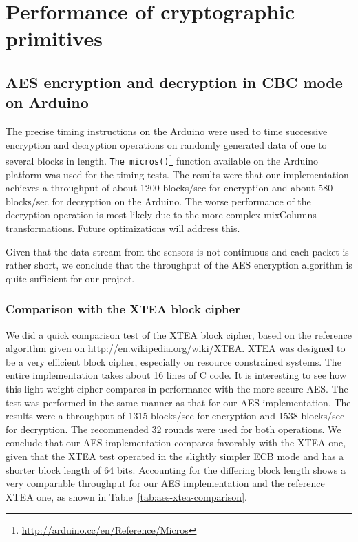 \section{Performance of cryptographic primitives}

\subsection{AES encryption and decryption in CBC mode on Arduino}

The precise timing instructions on the Arduino were used to time successive encryption and decryption operations on randomly generated data of one to several blocks in length. \texttt{The micros()}\footnote{\url{http://arduino.cc/en/Reference/Micros}} function available on the Arduino platform was used for the timing tests. The results were that our implementation achieves a throughput of about 1200 blocks/sec for encryption and about 580 blocks/sec for decryption on the Arduino. The worse performance of the decryption operation is most likely due to the more complex mixColumns transformations. Future optimizations will address this.

Given that the data stream from the sensors is not continuous and each packet is rather short, we conclude that the throughput of the AES encryption algorithm is quite sufficient for our project.

\subsubsection*{Comparison with the XTEA block cipher}

We did a quick comparison test of the XTEA \cite{} block cipher, based on the reference algorithm given on \url{http://en.wikipedia.org/wiki/XTEA}. XTEA was designed to be a very efficient block cipher, especially on resource constrained systems. The entire implementation takes about 16 lines of C code. It is interesting to see how this light-weight cipher compares in performance with the more secure AES. The test was performed in the same manner as that for our AES implementation. The results were a throughput of 1315 blocks/sec for encryption and 1538 blocks/sec for decryption. The recommended 32 rounds were used for both operations. We conclude that our AES implementation compares favorably with the XTEA one, given that the XTEA test operated in the slightly simpler ECB mode and has a shorter block length of 64 bits. Accounting for the differing block length shows a very comparable throughput for our AES implementation and the reference XTEA one, as shown in Table~\ref{tab:aes-xtea-comparison}.

